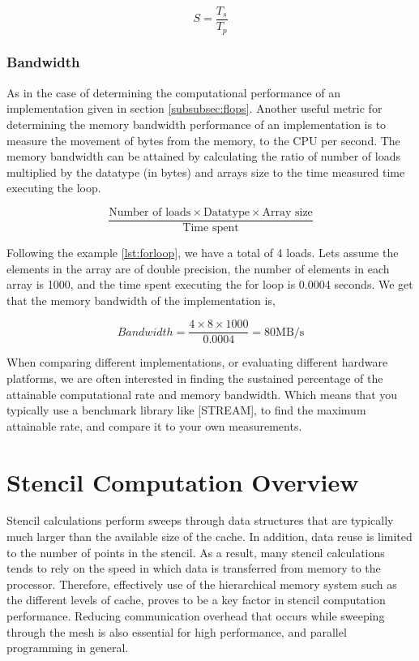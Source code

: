 \begin{equation} \label{speedup}
S = \frac{T_s}{T_p} 
\end{equation}

\subsubsection{Bandwidth}
As in the case of determining the computational performance of an implementation given in section \ref{subsubsec:flops}. Another useful metric for determining the memory bandwidth performance of an implementation is to measure the movement of bytes from the memory, to the CPU per second. The memory bandwidth can be attained by calculating the ratio of number of loads multiplied by the datatype (in bytes) and arrays size to the time measured time executing the loop.

\begin{equation} \label{bw}
\frac{\textrm{Number of loads} \times \textrm{Datatype}  \times \textrm{Array size}}{\textrm{Time spent}} 
\end{equation}

Following the example \ref{lst:forloop}, we have a total of 4 loads. Lets assume the elements in the array are of double precision, the number of elements in  each array is 1000, and the time spent executing the for loop is 0.0004 seconds. We get that the memory bandwidth of the implementation is, 

\begin{equation} \label{bwsolved}
Bandwidth = \frac{4 \times 8 \times 1000}{0.0004} =  80 \textrm {MB/s}
\end{equation}

When comparing different implementations, or evaluating different hardware platforms, we are often interested in finding the sustained percentage of the attainable computational rate and memory bandwidth. Which means that you typically use a benchmark library like [STREAM], to find the maximum attainable rate, and compare it to your own measurements.


\section{Stencil Computation Overview}
Stencil calculations perform sweeps through data structures that are typically much larger than the available size of the cache. In addition, data reuse is limited to the number of points in the stencil. As a result, many stencil calculations tends to rely on the speed in which data is transferred from memory to the processor. Therefore, effectively use of the hierarchical memory system such as the different levels of cache, proves to be a key factor in stencil computation performance. Reducing communication overhead that occurs while sweeping through the mesh is also essential for high performance, and parallel programming in general.

